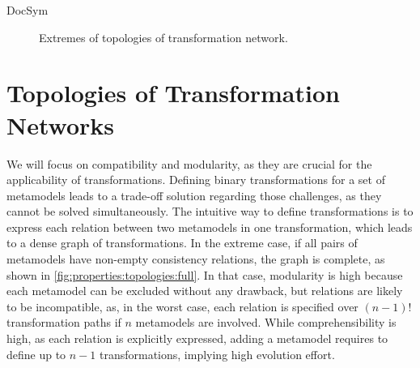 \begin{copiedFrom}{DocSym}
\begin{figure}
    \centering
    
    \caption[Extremes of transformation network topologies]{Extremes of topologies of transformation network.}
    \label{fig:topologies:modularization_strategies}
\end{figure}

\section{Topologies of Transformation Networks}

We will focus on compatibility and modularity, as they are crucial for the applicability of transformations. %
Defining binary transformations %
for a set of metamodels leads to a trade-off solution regarding those challenges, as they cannot be solved simultaneously.
The intuitive way to define transformations %
is to express each relation between two metamodels in one transformation, which leads to a dense graph of transformations. %
In the extreme case, if all pairs of metamodels have non-empty consistency relations, the graph is complete, as shown in \autoref{fig:properties:topologies:full}.
In that case, modularity is high because each metamodel can be excluded without any drawback, %
but relations are likely to be incompatible, as, in the worst case, each relation is specified over $(n-1)!$ transformation paths if $n$ metamodels are involved.
While comprehensibility is high, as each relation is explicitly expressed, adding a metamodel requires to define up to $n-1$ transformations, implying high evolution effort.


\end{copiedFrom}
